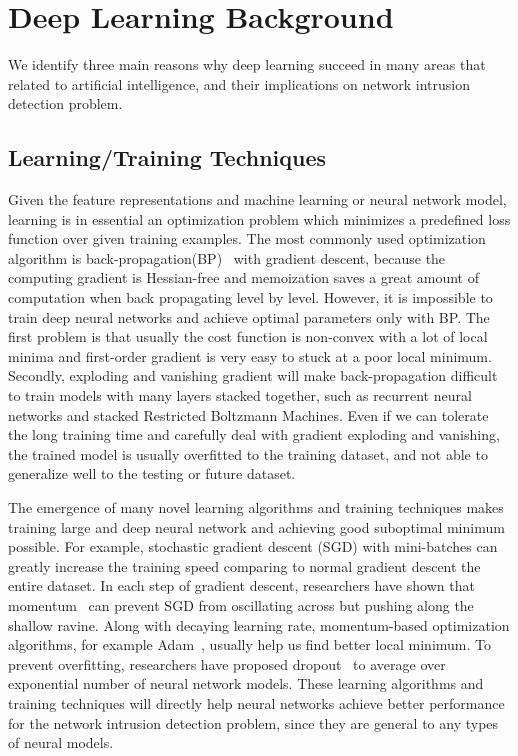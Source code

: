 \section{Deep Learning Background}
We identify three main reasons why deep learning succeed in many areas that related
to artificial intelligence, and their implications on network intrusion detection problem.

\subsection{Learning/Training Techniques}
Given the feature representations and machine learning or neural network model,
learning is in essential an optimization problem which minimizes a predefined loss function over given training examples.
The most commonly used optimization algorithm is back-propagation(BP)~\cite{Backpropagation} with gradient descent,
because the computing gradient is Hessian-free and memoization saves a great amount of computation when
back propagating level by level.
However, it is impossible to train deep neural networks and achieve optimal parameters only with BP.
The first problem is that usually the cost function is non-convex with a lot of local minima and
first-order gradient is very easy to stuck at a poor local minimum.
Secondly, exploding and vanishing gradient will make back-propagation difficult to train models with many layers stacked together, such as recurrent neural networks and stacked Restricted Boltzmann Machines.
Even if we can tolerate the long training time and carefully deal with gradient exploding and vanishing,
the trained model is usually overfitted to the training dataset, and not able to generalize well to the testing or future dataset.

The emergence of many novel learning algorithms and training techniques makes training large and deep
neural network and achieving good suboptimal minimum possible.
For example, stochastic gradient descent (SGD) with mini-batches can greatly increase the training speed comparing
to normal gradient descent the entire dataset.
In each step of gradient descent, researchers have shown that momentum~\cite{Momentum} can
prevent SGD from oscillating across but pushing along the shallow ravine.
Along with decaying learning rate, momentum-based optimization algorithms, for example Adam~\cite{Adam},
usually help us find better local minimum.
To prevent overfitting, researchers have proposed dropout~\cite{Dropout} to average over
exponential number of neural network models.
These learning algorithms and training techniques will directly help neural networks achieve
better performance for the network intrusion detection problem,
since they are general to any types of neural models.



